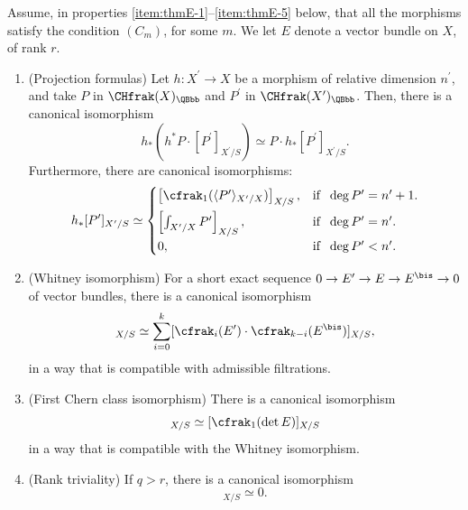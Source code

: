 \begin{thm}\label{thm:F}
Assume, in properties \eqref{item:thmE-1}--\eqref{item:thmE-5} below, that all the morphisms satisfy the condition $(C_{m})$, for some $m$. We let $E$ denote a vector bundle on $X$, of rank $r$.

\begin{enumerate}
\item\label{item:thmE-1} (Projection formulas) Let $h\colon X^{\prime}\to X$ be a morphism of relative dimension $n^{\prime}$, and take $P$ in $\CHfrak(X)_{\QBbb}$ and $P^{\prime}$ in $\CHfrak(X^{\prime})_{\QBbb}$.
Then, there is a canonical isomorphism
\begin{displaymath}
h_\ast (h^\ast P \cdot [P^{\prime}]_{X^{\prime}/S} ) \simeq P \cdot h_{\ast} [P^{\prime}]_{X^{\prime}/S}.
\end{displaymath}
Furthermore, there are canonical isomorphisms:
\begin{displaymath}
h_\ast [P']_{X^{\prime}/S} \simeq
\begin{cases}
\left[ \cfrak_1 (\langle P^{\prime} \rangle_{X^{\prime}/X})\right]_{X/S}, & \text{if }\; \deg P^{\prime}=n^{\prime}+1.\\[5pt]
\left[ \int_{X^{\prime}/X}P^{\prime} \right]_{X/S}, & \text{if }\; \deg P^{\prime} = n^{\prime}. \\[5pt]
0, & \text{if }\; \deg P^{\prime} < n^{\prime}.
\end{cases}
\end{displaymath}
\item (Whitney isomorphism) For a short exact sequence $0 \to E^{\prime}\to E \to E^{\bis} \to 0$ of vector bundles, there is a canonical isomorphism
\begin{displaymath}
[\cfrak_{k}(E)]_{X/S}\simeq \sum_{i=0}^{k} [\cfrak_{i}(E^{\prime})\cdot\cfrak_{k-i}(E^{\bis})]_{X/S},
\end{displaymath}
in a way that is compatible with admissible filtrations.
\item(First Chern class isomorphism) There is a canonical isomorphism
\begin{displaymath}
[\cfrak_1(E)]_{X/S} \simeq [\cfrak_1(\det E)]_{X/S}
\end{displaymath}
in a way that is compatible with the Whitney isomorphism.
\item (Rank triviality) If $q >r$, there is a canonical isomorphism
\begin{displaymath}
[ \cfrak_q(E)]_{X/S} \simeq 0.
\end{displaymath}

\end{enumerate}
\end{thm}
